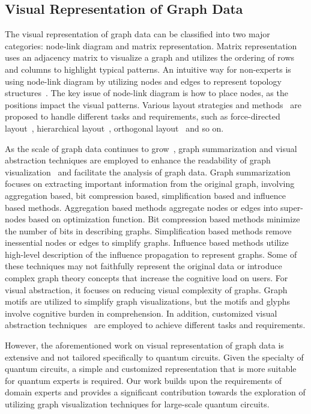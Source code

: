 \subsection{Visual Representation of Graph Data}
The visual representation of graph data can be classified into two major categories: node-link diagram and matrix representation.
Matrix representation~\cite{mueller2007comparison,pan2020rcanalyzer,han2022inet} uses an adjacency matrix to visualize a graph and utilizes the ordering of rows and columns to highlight typical patterns.
An intuitive way for non-experts is using node-link diagram by utilizing nodes and edges to represent topology structures~\cite{ghoniem2004comparison,purchase2007important,han2021netv}.
The key issue of node-link diagram is how to place nodes, as the positions impact the visual patterns.
Various layout strategies and methods~\cite{hachul2007large,haleem2019evaluating,kwon2019deep,zhu2020drgraph,Wang:2021:G6} are proposed to handle different tasks and requirements, such as force-directed layout~\cite{hachul2005drawing,jacomy2014forceatlas2}, hierarchical layout~\cite{north2002online}, orthogonal layout~\cite{gorg2005dynamic,biedl1998better} and so on.

As the scale of graph data continues to grow~\cite{lee2006task}, graph summarization\cite{Liu:2018:GSM} and visual abstraction techniques are employed to enhance the readability of graph visualization~\cite{chen2018structure,han2021visual} and facilitate the analysis of graph data. 
Graph summarization focuses on extracting important information from the original graph, 
involving aggregation based, bit compression based, simplification based and influence based methods.
Aggregation based methods aggregate nodes or edges into super-nodes based on optimization function\cite{lefevre2010grass, maccioni2016scalable}.
Bit compression based methods minimize the number of bits in describing graphs\cite{navlakha2008graph, koutra2014vog}.
Simplification based methods remove inessential nodes or edges to simplify graphs\cite{shen2006visual,ghashami2016efficient}.
Influence based methods utilize high-level description of the influence propagation to represent graphs\cite{mehmood2013csi,mathioudakis2011sparsification}.
Some of these techniques may not faithfully represent the original data or introduce complex graph theory concepts that increase the cognitive load on users.
For visual abstraction, it focuses on reducing visual complexity of graphs. Graph motifs\cite{motif2013cody, module2017li} are utilized to simplify graph visualizations, but the motifs and glyphs involve cognitive burden in comprehension.
In addition, customized visual abstraction techniques~\cite{Viola:2018:PCAV} are employed to achieve different tasks and requirements\cite{Zhao:2023:ASTF,Zhou:2019:VALS}.

However, the aforementioned work on visual representation of graph data is extensive and not tailored specifically to quantum circuits.
Given the specialty of quantum circuits, a simple and customized representation that is more suitable for quantum experts is required.
Our work builds upon the requirements of domain experts and provides a significant contribution towards the exploration of utilizing graph visualization techniques for large-scale quantum circuits.
